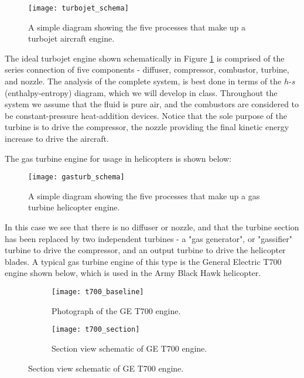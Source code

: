 \begin{figure}[H]
  \centering
  \texttt{[image: turbojet\_schema]}
  \caption{A simple diagram showing the five processes that make up a turbojet aircraft engine.}
  \label{fig:turbojet_schema}
\end{figure}

The ideal turbojet engine shown schematically in Figure \ref{fig:turbojet_schema} is comprised of the series connection of five components - diffuser, compressor, combustor, turbine, and nozzle. The analysis of the complete system, is best done in terms of the $h$-$s$ (enthalpy-entropy) diagram, which we will develop in class. Throughout the system we assume that the fluid is pure air, and the combustors are considered to be constant-pressure heat-addition devices. Notice that the sole purpose of the turbine is to drive the compressor, the nozzle providing the final kinetic energy increase to drive the aircraft.

The gas turbine engine for usage in helicopters is shown below:

\begin{figure}[H]
  \centering
  \texttt{[image: gasturb\_schema]}
  \caption{A simple diagram showing the five processes that make up a gas turbine helicopter engine.}
  \label{fig:gasturb_schema}
\end{figure}

In this case we see that there is no diffuser or nozzle, and that the turbine section has been replaced by two independent turbines - a "gas generator", or "gassifier" turbine to drive the compressor, and an output turbine to drive the helicopter blades. A typical gas turbine engine of this type is the General Electric T700 engine shown below, which is used in the Army Black Hawk helicopter.

\begin{figure}[H]
\centering
\begin{subfigure}{.5\textwidth}
  \centering
  \texttt{[image: t700\_baseline]}
  \caption{Photograph of the GE T700 engine.}
  \label{fig:t700_baseline}
\end{subfigure}%
\begin{subfigure}{.5\textwidth}
  \centering
  \texttt{[image: t700\_section]}
  \caption{Section view schematic of GE T700 engine.}
  \label{fig:t700_section}
\end{subfigure}
\end{figure}


